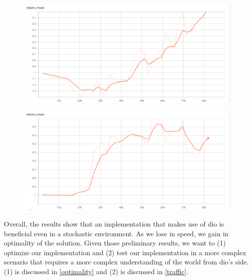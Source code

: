     \begin{figure}[H]
      \centering
      \begin{minipage}{.5\textwidth}
        \centering
        \includegraphics[width=1\linewidth]{figures/dioreturn.png}
        \label{fig:returndio}
      \end{minipage}%
      \begin{minipage}{.5\textwidth}
        \centering
        \includegraphics[width=1\linewidth]{figures/rlreturn.png}
        \label{fig:returnrl}
      \end{minipage}
    \end{figure}

    Overall, the results show that an implementation that makes use of dio is beneficial even in a stochastic environment. 
    As we lose in speed, we gain in optimality of the solution. 
    Given those preliminary results, we want to (1) optimize our implementation 
    and (2) test our implementation in a more complex scenario that requires a more complex understanding of the world 
    from dio's side. (1) is discussed in \ref{optimality} and (2) is discussed in \ref{traffic}. 

